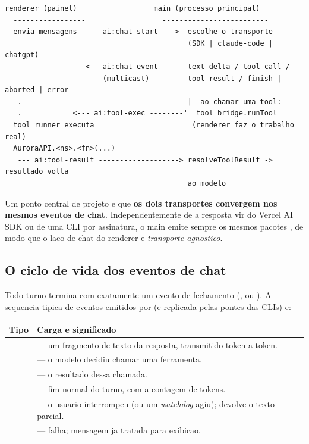 \begin{lstlisting}[caption={Fluxo geral de um turno de chat (ASCII).}]
  renderer (painel)                  main (processo principal)
  -----------------                  -------------------------
  envia mensagens  --- ai:chat-start --->  escolhe o transporte
                                           (SDK | claude-code | chatgpt)
                   <-- ai:chat-event ----  text-delta / tool-call /
                       (multicast)         tool-result / finish | aborted | error
   .                                       |  ao chamar uma tool:
   .            <--- ai:tool-exec --------'  tool_bridge.runTool
  tool_runner executa                       (renderer faz o trabalho real)
  AuroraAPI.<ns>.<fn>(...)
   --- ai:tool-result -------------------> resolveToolResult -> resultado volta
                                           ao modelo
\end{lstlisting}

Um ponto central de projeto e que \textbf{os dois transportes convergem nos
mesmos eventos de chat}. Independentemente de a resposta vir do Vercel AI SDK ou
de uma CLI por assinatura, o main emite sempre os mesmos pacotes
, de modo que o laco de chat do renderer e
\emph{transporte-agnostico}.

\subsection{O ciclo de vida dos eventos de chat}

Todo turno termina com exatamente um evento de fechamento
(,  ou ). A sequencia tipica de eventos
emitidos por  (e replicada pelas pontes das CLIs) e:

\begin{tabularx}{\linewidth}{l Y}
\toprule
\textbf{Tipo} & \textbf{Carga e significado} \\
\midrule
{}   &  --- um fragmento de texto da resposta, transmitido token a token. \\
    &  --- o modelo decidiu chamar uma ferramenta. \\
  &  --- o resultado dessa chamada. \\
       &  --- fim normal do turno, com a contagem de tokens. \\
      &  --- o usuario interrompeu (ou um \emph{watchdog} agiu); devolve o texto parcial. \\
        &  --- falha; mensagem ja tratada para exibicao. \\
\bottomrule
\end{tabularx}

